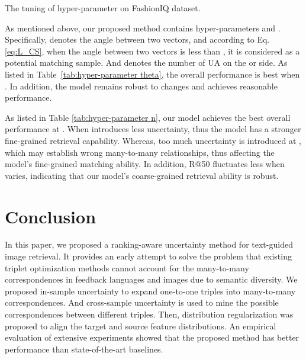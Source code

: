 \documentclass[letterpaper]{article} \usepackage{aaai24}  \usepackage{times}  \usepackage{helvet}  \usepackage{courier}  \usepackage[hyphens]{url}  \usepackage{graphicx} \urlstyle{rm} \def\UrlFont{\rm}  \usepackage{natbib}  \usepackage{caption} \frenchspacing  \setlength{\pdfpagewidth}{8.5in} \setlength{\pdfpageheight}{11in} \usepackage{amsmath,amsfonts}
\begin{document}
\begin{threeparttable}
    \centering
    \caption{The tuning of hyper-parameter  on FashionIQ dataset.}
    \label{tab:hyper-parameter n}
\end{threeparttable}
\fi

As mentioned above, our proposed method contains hyper-parameters  and . Specifically,  denotes the angle between two vectors, and according to Eq. \ref{eq:L_CS}, when the angle between two vectors is less than , it is considered as a potential matching sample. And  denotes the number of UA on the  or  side. As listed in Table~\ref{tab:hyper-parameter theta}, the overall performance is best when . In addition, the model remains robust to  changes and achieves reasonable performance.

As listed in Table \ref{tab:hyper-parameter n}, our model achieves the best overall performance at . When  introduces less uncertainty, thus the model has a stronger fine-grained retrieval capability. Whereas, too much uncertainty is introduced at , which may establish wrong many-to-many relationships, thus affecting the model's fine-grained matching ability. In addition, R@50 fluctuates less when  varies, indicating that our model's coarse-grained retrieval ability is robust.

\section{Conclusion}
In this paper, we proposed a ranking-aware uncertainty method for text-guided image retrieval. It provides an early attempt to solve the problem that existing triplet optimization methods cannot account for the many-to-many correspondences in feedback languages and images due to semantic diversity. We proposed in-sample uncertainty to expand one-to-one triples into many-to-many correspondences. And cross-sample uncertainty is used to mine the possible correspondences between different triples. Then, distribution regularization was proposed to align the target and source feature distributions. An empirical evaluation of extensive experiments showed that the proposed method has better performance than state-of-the-art baselines.


\end{document}
